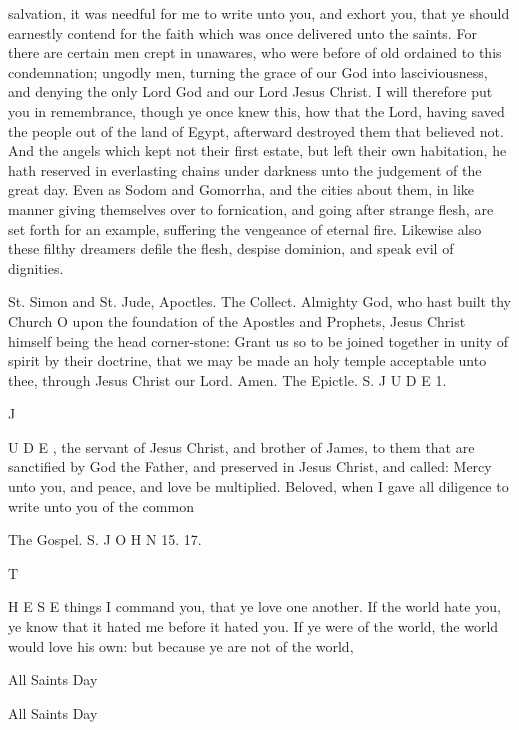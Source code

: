 salvation, it was needful for me to write unto you, and exhort you, that ye should earnestly contend for the faith which was once delivered unto the saints. For there are certain men crept in unawares, who were before of old ordained to this condemnation; ungodly men, turning the grace of our God into lasciviousness, and denying the only Lord God and our Lord Jesus Christ. I will therefore put you in remembrance, though ye once knew this, how that the Lord, having saved the people out of the land of Egypt, afterward destroyed them that believed not. And the angels which kept not their first estate, but left their own habitation, he hath reserved in everlasting chains under darkness unto the judgement of the great day. Even as Sodom and Gomorrha, and the cities about them, in like manner giving themselves over to fornication, and going after strange flesh, are set forth for an example, suffering the vengeance of eternal fire. Likewise also these filthy dreamers defile the flesh, despise dominion, and speak evil of dignities.

St. Simon and St. Jude, Apoctles. The Collect. Almighty God, who hast built thy Church O upon the foundation of the Apostles and Prophets, Jesus Christ himself being the head corner-stone: Grant us so to be joined together in unity of spirit by their doctrine, that we may be made an holy temple acceptable unto thee, through Jesus Christ our Lord. Amen. The Epictle. S. J U D E 1.

J

U D E , the servant of Jesus Christ, and brother of James, to them that are sanctified by God the Father, and preserved in Jesus Christ, and called: Mercy unto you, and peace, and love be multiplied. Beloved, when I gave all diligence to write unto you of the common

The Gospel. S. J O H N 15. 17.

T

H E S E things I command you, that ye love one another. If the world hate you, ye know that it hated me before it hated you. If ye were of the world, the world would love his own: but because ye are not of the world,

All Saints Day

All Saints Day

